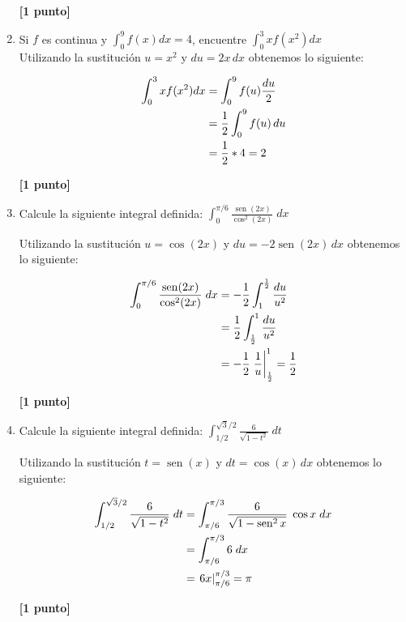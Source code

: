 \documentclass[letterpaper,10pt]{article}
\newcommand{\dis}{\displaystyle}
\def\sin{\operatorname{sen}}
\begin{document}
\begin{enumerate}
\dotfill\textbf{[1 punto]}

\newpage








\item Si $f$ es continua y $\displaystyle \int_0^9f(x)dx=4$, encuentre $\displaystyle \int_0^3xf(x^2)dx$\\

Utilizando la sustitución $u = x^2$ y $du = 2x \, dx$ obtenemos lo siguiente:

\begin{align*}
 \dis  \displaystyle \int_0^3xf(x^2)dx  &= \displaystyle \int_0^9f(u) \frac{du}{2}\\
 \dis    &= \frac{1}{2}\int_{0}^{9} f(u)\, du\\
 \dis    &= \frac{1}{2}* 4 = 2\\
\end{align*}

\dotfill\textbf{[1 punto]}




\item Calcule la siguiente integral definida: $\dis \int_{0}^{\pi/6} \frac{\sin(2x)}{\cos^2(2x)} \; dx$

Utilizando la sustitución $u = \cos (2x)$ y $du = -2\sin (2x) \, dx$ obtenemos lo siguiente:

\begin{align*}
 \dis \int_{0}^{\pi/6} \frac{\sin(2x)}{\cos^2(2x)} \; dx  &= \displaystyle -\frac{1}{2} \int_1^{\frac{1}{2}} \frac{du}{u^2}\\
 \dis    &= \displaystyle \frac{1}{2} \int_{\frac{1}{2}}^1 \frac{du}{u^2}\\
 \dis    &= -\frac{1}{2} \left.\frac{1}{u}\right|_{\frac{1}{2}}^1 = \frac{1}{2}
\end{align*}

\dotfill\textbf{[1 punto]}


\item Calcule la siguiente integral definida: $\dis \int_{1/2}^{\sqrt{3}/2} \frac{6}{\sqrt{1-t^2}} \; dt$

Utilizando la sustitución $t = \sin (x)$ y $dt = \cos (x) \, dx$ obtenemos lo siguiente:

\begin{align*}
 \dis \int_{1/2}^{\sqrt{3}/2} \frac{6}{\sqrt{1-t^2}} \; dt  &= \dis \int_{\pi/6}^{\pi/3} \frac{6}{\sqrt{1-\sin^2x}} \; \cos x \; dx\\
 \dis    &= \dis \int_{\pi/6}^{\pi/3} 6 \; dx\\
 \dis    &=\displaystyle  \left.6x\right|_{\pi/6}^{\pi/3} = \pi
\end{align*}

\dotfill\textbf{[1 punto]}

\end{enumerate}




\vspace{10mm}
\end{document}
